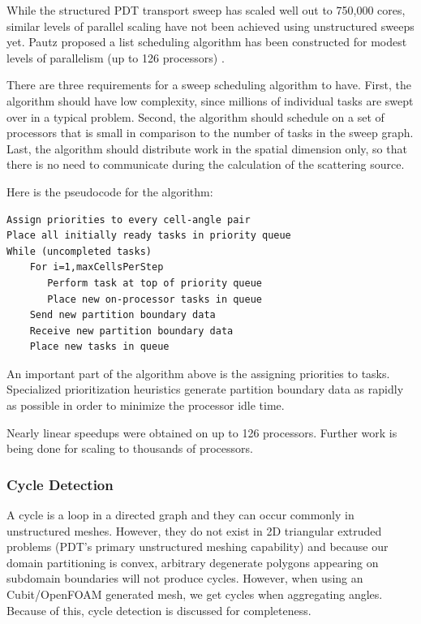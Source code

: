 \documentclass[11pt, letterpaper,titlepage,oneside]{article}
\begin{document}
While the structured PDT transport sweep has scaled well out to 750,000 cores, similar levels of parallel scaling have not been achieved using unstructured sweeps yet. Pautz proposed a list scheduling algorithm has been constructed for modest levels of parallelism (up to 126 processors)\cite{Pautz} .

There are three requirements for a sweep scheduling algorithm to have. First, the algorithm should have low complexity, since millions of individual tasks are swept over in a typical problem. Second, the algorithm should schedule on a set of processors that is small in comparison to the number of tasks in the sweep graph. Last, the algorithm should distribute work in the spatial dimension only, so that there is no need to communicate during the calculation of the scattering source. 

Here is the pseudocode for the algorithm:

\begin{verbatim}
Assign priorities to every cell-angle pair
Place all initially ready tasks in priority queue
While (uncompleted tasks)
    For i=1,maxCellsPerStep
       Perform task at top of priority queue
       Place new on-processor tasks in queue
    Send new partition boundary data
    Receive new partition boundary data
    Place new tasks in queue 
\end{verbatim}

An important part of the algorithm above is the assigning priorities to tasks. Specialized prioritization heuristics generate partition boundary data as rapidly as possible in order to minimize the processor idle time. 

Nearly linear speedups were obtained on up to 126 processors. Further work is being done for scaling to thousands of processors. 

\subsubsection{Cycle Detection}

A cycle is a loop in a directed graph and they can occur commonly in unstructured meshes. However, they do not exist in 2D triangular extruded problems (PDT's primary unstructured meshing capability) and because our domain partitioning is convex, arbitrary degenerate polygons appearing on subdomain boundaries will not produce cycles. However, when using an Cubit/OpenFOAM generated mesh, we get cycles when aggregating angles. Because of this, cycle detection is discussed for completeness. 
\end{document}
